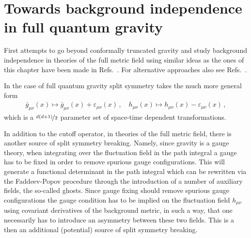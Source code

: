 \documentclass[11pt]{book}
\numberwithin{equation}{chapter}
\begin{document}
\section{Towards background independence in full quantum gravity}
\label{sec:msWIquantumgravity}

First attempts to go beyond conformally truncated gravity and study background
independence in theories of the full metric field using similar ideas as
the ones of this chapter have been made in
Refs.~\cite{Morris:2016spn, Percacci:2016arh}.
For alternative approaches also see
Refs.~\cite{
  Donkin:2012ud, Manrique:2009uh, Manrique:2010mq, Manrique:2010am,
  Becker:2014qya, Christiansen:2012rx, Christiansen:2014raa
}.

In the case of full quantum gravity split symmetry
takes the much more general form
\begin{align}
  \bar g_{\mu \nu}(x) \mapsto \bar g_{\mu\nu}(x) + \varepsilon_{\mu\nu}(x) \,,
  \quad
  h_{\mu \nu}(x) \mapsto h_{\mu\nu}(x) - \varepsilon_{\mu\nu}(x) \,,
\end{align}
which is a $\nicefrac{d(d+1)}{2}$ parameter set of space-time dependent transformations.

In addition to the cutoff operator, in theories of the full metric field,
there is another source of split symmetry breaking. Namely, since gravity is a
gauge theory, when integrating over the fluctuation field in the path integral
a gauge has to be fixed in order to remove spurious gauge configurations.
This will generate a functional determinant in the path integral which can be rewritten via
the Faddeev-Popov procedure through the introduction of a number of auxiliary fields,
the so-called ghosts. Since gauge fixing should remove spurious gauge configurations
the gauge condition has to be implied on the fluctuation field $h_{\mu\nu}$ using
covariant derivatives of the background metric, in such a way, that one necessarily
has to introduce an asymmetry between these two fields. This is a then an additional
(potential) source of split symmetry breaking.
\end{document}
